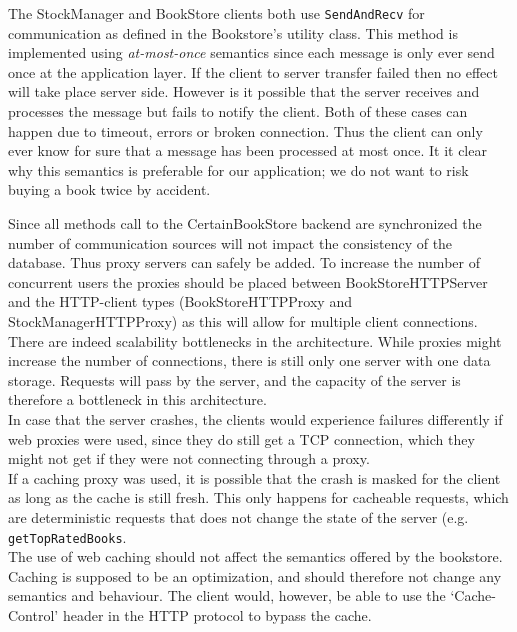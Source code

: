 \documentclass[11pt]{article}
\begin{document}

The StockManager and BookStore clients both use \texttt{SendAndRecv} for communication as defined in the Bookstore’s utility class. This method is implemented using \emph{at-most-once} semantics since each message is only ever send once at the application layer. If the client to server transfer failed then no effect will take place server side. However is it possible that the server receives and processes the message but fails to notify the client. Both of these cases can happen due to timeout, errors or broken connection. Thus the client can only ever know for sure that a message has been processed at most once. It it
clear why this semantics is preferable for our application; we do not want to risk buying
a book twice by accident.



Since all methods call to the CertainBookStore backend are synchronized the number of communication sources will not impact the consistency of the database. Thus proxy servers can safely be added. To increase the number of concurrent users the proxies should be placed between BookStoreHTTPServer and the HTTP-client types (BookStoreHTTPProxy and StockManagerHTTPProxy) as this will allow for multiple client connections.\\


There are indeed scalability bottlenecks in the architecture. While proxies might increase the number of connections, there is still only one server with one data storage. Requests will pass by the server, and the capacity of the server is therefore a bottleneck in this architecture.\\


In case that the server crashes, the clients would experience failures differently if web proxies were used, since they do still get a TCP connection, which they might not get if they were not connecting through a proxy.\\

If a caching proxy was used, it is possible that the crash is masked for the client as long as the cache is still fresh. This only happens for cacheable requests, which are deterministic requests that does not change the state of the server (e.g. \texttt{getTopRatedBooks}.\\

The use of web caching should not affect the semantics offered by the bookstore. Caching is supposed to be an optimization, and should therefore not change any semantics and behaviour. The client would, however, be able to use the ‘Cache-Control’ header in the HTTP protocol to bypass the cache.\\
\end{document}
